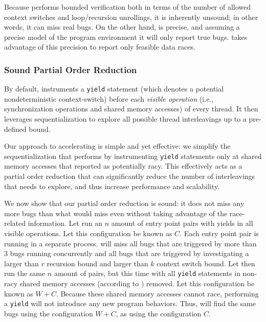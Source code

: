 Because \corral performs bounded verification both in terms of the number of allowed context switches and loop/recursion unrollings, it is inherently unsound; in other words, it can miss real bugs. On the other hand, \corral is precise, and assuming a precise model of the program environment it will only report true bugs. \whoop takes advantage of this precision to report only feasible data races.

\subsubsection{Sound Partial Order Reduction}
\label{bf:reduction}

By default, \corral instruments a \texttt{yield} statement (which denotes a
potential nondeterministic context-switch) before each \emph{visible operation}
(i.e., synchronization operations and shared memory accesses) of every thread.
It then leverages sequentialization to explore all possible thread interleavings
up to a pre-defined bound.

Our approach to accelerating \corral is simple and yet effective: we simplify
the sequentialization that \corral performs by instrumenting \texttt{yield}
statements only at shared memory accesses that \whoop reported as potentially
racy. This effectively acts as a partial order reduction that can significantly
reduce the number of interleavings that \corral needs to explore, and thus
increase performance and scalability.

We now show that our partial order reduction is sound: it does not miss any more
bugs than what \corral would miss even without taking advantage of the \whoop
race-related information. Let \corral run an $n$ amount of entry point pairs
with yields in all visible operations. Let this configuration be known as $C$.
Each entry point pair is running in a separate \corral process. \corral will
miss all bugs that are triggered by more than 3 bugs running concurrently and
all bugs that are triggered by investigating a larger than $r$ recursion bound
and larger than $k$ context switch bound. Let \corral then run the same $n$
amount of pairs, but this time with all \texttt{yield} statements in non-racy
shared memory accesses (according to \whoop) removed. Let this configuration be
known as $W+C$. Because these shared memory accesses cannot race, performing a
\texttt{yield} will not introduce any new program behaviors. Thus, \corral will
find the same bugs using the configuration $W+C$, as using the configuration
$C$.

